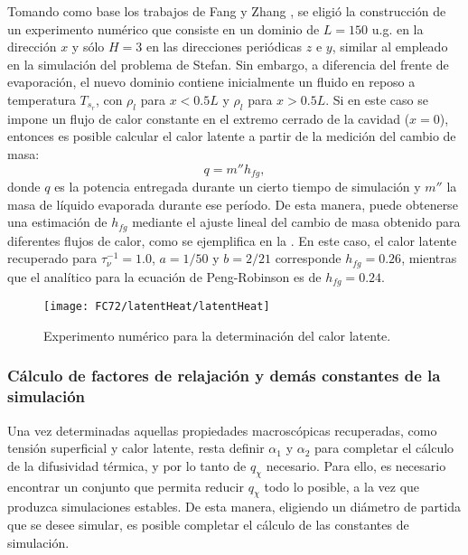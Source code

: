 Tomando como base los trabajos de Fang \cite{fang_lattice_2017} y Zhang \cite{zhang_simulation_2015}, se eligi\'o la construcci\'on de un experimento num\'erico que consiste en un dominio de $L=150$ u.g. en la direcci\'on $x$ y s\'olo $H=3$ en las direcciones peri\'odicas $z$ e $y$, similar al empleado en la simulaci\'on del problema de Stefan. Sin embargo, a diferencia del frente de evaporaci\'on, el nuevo dominio contiene inicialmente un fluido en reposo a temperatura $T_{s_r}$, con $\rho_l$ para $x<0.5L$ y $\rho_l$ para $x>0.5L$. Si en este caso se impone un flujo de calor constante en el extremo cerrado de la cavidad ($x=0$), entonces es posible calcular el calor latente a partir de la medici\'on del cambio de masa:
\begin{equation}
	q = m'' h_{fg},
\end{equation}
donde $q$ es la potencia entregada durante un cierto tiempo de simulaci\'on y $m''$ la masa de l\'iquido evaporada durante ese per\'iodo. De esta manera, puede obtenerse una estimaci\'on de $h_{fg}$ mediante el ajuste lineal del cambio de masa obtenido para diferentes flujos de calor, como se ejemplifica en la . En este caso, el calor latente recuperado para $\tau_{\nu}^{-1}=1.0$, $a=1/50$ y $b=2/21$ corresponde $h_{fg}=0.26$, mientras que el anal\'itico para la ecuaci\'on de Peng-Robinson \cite{peng_new_1976} es de $h_{fg}=0.24$.

\begin{figure}[ht]
	\centering
	\texttt{[image: FC72/latentHeat/latentHeat]}
	\caption{Experimento num\'erico para la determinaci\'on del calor latente.}
	\label{fig:calor_latente_3D}
\end{figure}


\subsubsection{C\'alculo de factores de relajaci\'on y dem\'as constantes de la simulaci\'on}

Una vez determinadas aquellas propiedades macrosc\'opicas recuperadas, como tensi\'on superficial y calor latente, resta definir $\alpha_1$ y $\alpha_2$ para completar el c\'alculo de la difusividad t\'ermica, y por lo tanto de $q_{\chi}$ necesario. Para ello, es necesario encontrar un conjunto que permita reducir $q_{\chi}$ todo lo posible, a la vez que produzca simulaciones estables. De esta manera, eligiendo un di\'ametro de partida que se desee simular, es posible completar el c\'alculo de las constantes de simulaci\'on. 

